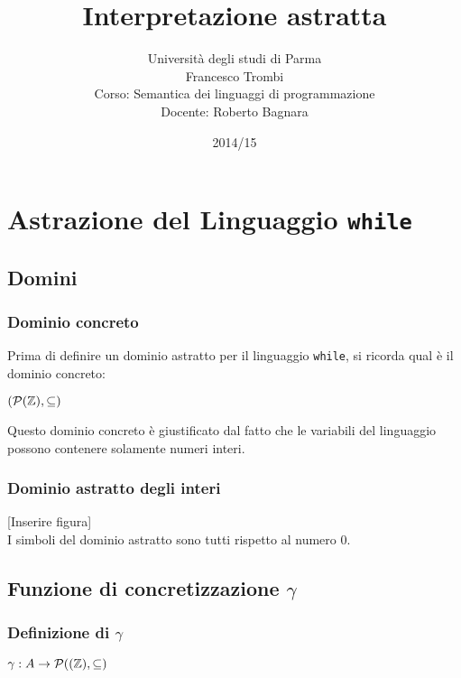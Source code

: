 \documentclass[a4paper, 12pt, oneside,fleqn]{book}
\begin{document}
\title{Interpretazione astratta}
\author{
	Università degli studi di Parma \\
	Francesco Trombi \\
	Corso: Semantica dei linguaggi di programmazione \\
	Docente: Roberto Bagnara
}
\date{2014/15}
\maketitle
\tableofcontents

\newpage

\chapter{Astrazione del Linguaggio \tt{while}}

\section{Domini}

\subsection{Dominio concreto}
Prima di definire un dominio astratto per il linguaggio {\tt while}, si ricorda qual è il dominio concreto:
\begin{center}
	$ (\mathcal{P}{(\mathbb{Z}), \subseteq)} $
\end{center}
Questo dominio concreto è giustificato dal fatto che le variabili del linguaggio possono contenere solamente numeri interi.

\subsection{Dominio astratto degli interi}
[Inserire figura]\\
I simboli del dominio astratto sono tutti rispetto al numero $0$.

\section{Funzione di concretizzazione $\gamma$}

\subsection{Definizione di $\gamma$}
\begin{center}
	$ \gamma : A \rightarrow \mathcal{P}({(\mathbb{Z}), \subseteq)} $
\end{center}
\end{document}

